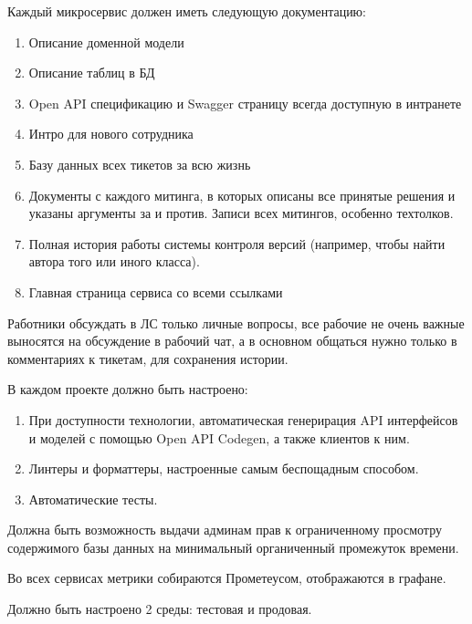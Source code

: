 
Каждый микросервис должен иметь следующую документацию:
\begin{enumerate}
      \item Описание доменной модели
      \item Описание таблиц в БД
      \item Open API спецификацию и Swagger страницу
            всегда доступную в интранете
      \item Интро для нового сотрудника
      \item Базу данных всех тикетов за всю жизнь
      \item Документы с каждого митинга, в которых описаны
            все принятые решения и указаны аргументы
            за и против. Записи всех митингов, особенно
            техтолков.
      \item Полная история работы системы контроля версий
            (например, чтобы найти автора того или иного класса).
      \item Главная страница сервиса со всеми ссылками
\end{enumerate}

Работники обсуждать в ЛС только личные вопросы, все рабочие
не очень важные выносятся на обсуждение в рабочий чат,
а в основном общаться нужно только в комментариях к тикетам,
для сохранения истории.

В каждом проекте должно быть настроено:
\begin{enumerate}
      \item При доступности технологии, автоматическая
            генерирация API интерфейсов и моделей с помощью
            Open API Codegen, а также клиентов к ним.
      \item Линтеры и форматтеры, настроенные самым беспощадным способом.
      \item Автоматические тесты.
\end{enumerate}

Должна быть возможность выдачи админам прав к ограниченному
просмотру содержимого базы данных на минимальный органиченный
промежуток времени.

Во всех сервисах метрики собираются Прометеусом,
отображаются в графане.

Должно быть настроено 2 среды: тестовая и продовая.

